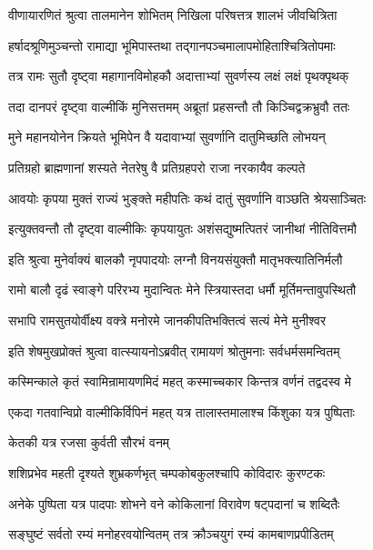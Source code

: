 \twolineshloka
{वीणायारणितं श्रुत्वा तालमानेन शोभितम्}
{निखिला परिषत्तत्र शालभं जीवचित्रिता}%

\twolineshloka
{हर्षादश्रूणिमुञ्चन्तो रामाद्या भूमिपास्तथा}
{तद्गानपञ्चमालापमोहिताश्चित्रितोपमाः}%

\twolineshloka
{तत्र रामः सुतौ दृष्ट्वा महागानविमोहकौ}
{अदात्ताभ्यां सुवर्णस्य लक्षं लक्षं पृथक्पृथक्}%

\twolineshloka
{तदा दानपरं दृष्ट्वा वाल्मीकिं मुनिसत्तमम्}
{अब्रूतां प्रहसन्तौ तौ किञ्चिद्वक्रभ्रुवौ ततः}%

\twolineshloka
{मुने महानयोनेन क्रियते भूमिपेन वै}
{यदावाभ्यां सुवर्णानि दातुमिच्छति लोभयन्}%

\twolineshloka
{प्रतिग्रहो ब्राह्मणानां शस्यते नेतरेषु वै}
{प्रतिग्रहपरो राजा नरकायैव कल्पते}%

\twolineshloka
{आवयोः कृपया मुक्तं राज्यं भुङ्क्ते महीपतिः}
{कथं दातुं सुवर्णानि वाञ्छति श्रेयसाञ्चितः}%

\twolineshloka
{इत्युक्तवन्तौ तौ दृष्ट्वा वाल्मीकिः कृपयायुतः}
{अशंसद्युष्मत्पितरं जानीथां नीतिवित्तमौ}%

\twolineshloka
{इति श्रुत्वा मुनेर्वाक्यं बालकौ नृपपादयोः}
{लग्नौ विनयसंयुक्तौ मातृभक्त्यातिनिर्मलौ}%

\twolineshloka
{रामो बालौ दृढं स्वाङ्गे परिरभ्य मुदान्वितः}
{मेने स्त्रियास्तदा धर्मौ मूर्तिमन्तावुपस्थितौ}%

\twolineshloka
{सभापि रामसुतयोर्वीक्ष्य वक्त्रे मनोरमे}
{जानकीपतिभक्तित्वं सत्यं मेने मुनीश्वर}%

\twolineshloka
{इति शेषमुखप्रोक्तं श्रुत्वा वात्स्यायनोऽब्रवीत्}
{रामायणं श्रोतुमनाः सर्वधर्मसमन्वितम्}%


\twolineshloka
{कस्मिन्काले कृतं स्वामिन्रामायणमिदं महत्}
{कस्माच्चकार किन्तत्र वर्णनं तद्वदस्व मे}%


\twolineshloka
{एकदा गतवान्विप्रो वाल्मीकिर्विपिनं महत्}
{यत्र तालास्तमालाश्च किंशुका यत्र पुष्पिताः}%

केतकी यत्र रजसा कुर्वती सौरभं वनम्

\twolineshloka
{शशिप्रभेव महती दृश्यते शुभ्रकर्णभृत्}
{चम्पकोबकुलश्चापि कोविदारः कुरण्टकः}%

\twolineshloka
{अनेके पुष्पिता यत्र पादपाः शोभने वने}
{कोकिलानां विरावेण षट्पदानां च शब्दितैः}%

\twolineshloka
{सङ्घुष्टं सर्वतो रम्यं मनोहरवयोन्वितम्}
{तत्र क्रौञ्चयुगं रम्यं कामबाणप्रपीडितम्}%

